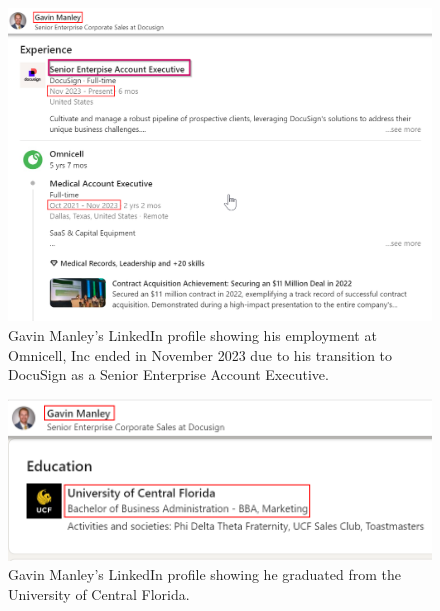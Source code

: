 \begin{fullwidth}
    \begin{figure}[H] %
        \label{sec:Fig2}
        \centering
        \includegraphics[width=.9\linewidth]{assets/ManleyLinkedin2.png}
        \captionsetup{justification=centering}
        \caption{Gavin Manley's LinkedIn profile showing his employment at Omnicell, Inc ended in November 2023 due to his transition to DocuSign as a Senior Enterprise Account Executive.}
    \end{figure}

    \begin{figure}[H] %
        \label{sec:Fig3}
        \centering
        \includegraphics[width=.9\linewidth]{assets/ManleyCollege.png}
        \captionsetup{justification=centering}
        \caption{Gavin Manley's LinkedIn profile showing he graduated from the University of Central Florida.}
    \end{figure}


\end{fullwidth}
